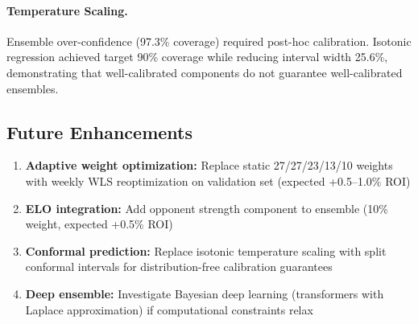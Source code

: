 \paragraph{Temperature Scaling.}
Ensemble over-confidence (97.3\% coverage) required post-hoc calibration. Isotonic regression achieved target 90\% coverage while reducing interval width 25.6\%, demonstrating that well-calibrated components do not guarantee well-calibrated ensembles.

\subsection{Future Enhancements}

\begin{enumerate}[itemsep=2pt,parsep=0pt]
    \item \textbf{Adaptive weight optimization:} Replace static 27/27/23/13/10 weights with weekly WLS reoptimization on validation set (expected +0.5--1.0\% ROI)
    \item \textbf{ELO integration:} Add opponent strength component to ensemble (10\% weight, expected +0.5\% ROI)
    \item \textbf{Conformal prediction:} Replace isotonic temperature scaling with split conformal intervals for distribution-free calibration guarantees
    \item \textbf{Deep ensemble:} Investigate Bayesian deep learning (transformers with Laplace approximation) if computational constraints relax
\end{enumerate}

